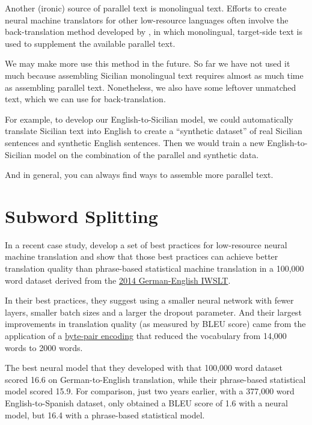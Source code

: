 \documentclass[10pt,letterpaper]{article}
\begin{document}
Another (ironic) source of parallel text is monolingual text.
Efforts to create neural machine translators for other low-resource languages often
involve the back-translation method developed by \citet{sennrich2015backtrans},
in which monolingual, target-side text is used to supplement the available parallel text.

We may make more use this method in the future. So far we have not used it much because
assembling Sicilian monolingual text requires almost as much time as assembling parallel text.
Nonetheless, we also have some leftover unmatched text, which we can use for back-translation.

For example, to develop our English-to-Sicilian model, we could automatically translate
Sicilian text into English to create a ``synthetic dataset'' of real Sicilian sentences
and synthetic English sentences.  Then we would train a new English-to-Sicilian model on the
combination of the parallel and synthetic data.

And in general, you can always find ways to assemble more parallel text.




\hypertarget{subword}{}

\section{Subword Splitting}

In a recent case study, \citet{sennrich2019loresnmt}
develop a set of best practices for low-resource neural machine translation and
show that those best practices can achieve better translation quality than
phrase-based statistical machine translation in a 100,000 word dataset derived from the
\href{https://sites.google.com/site/iwsltevaluation2014/}{2014 German-English IWSLT}.

In their best practices, they suggest using a smaller neural network with fewer layers,
smaller batch sizes and a larger the dropout parameter.  And their largest improvements
in translation quality (as measured by BLEU score) came from the application of a
\href{https://github.com/rsennrich/subword-nmt}{byte-pair encoding}
that reduced the vocabulary from 14,000 words to 2000 words.

\newpage

The best neural model that they developed with that 100,000 word dataset scored 16.6
on German-to-English translation, while their phrase-based statistical model scored 15.9.
For comparison, just two years earlier, with a 377,000 word English-to-Spanish dataset,
\citet{koehnknowles2017} only obtained a BLEU score of 1.6 with a neural model,
but 16.4 with a phrase-based statistical model.
\end{document}
